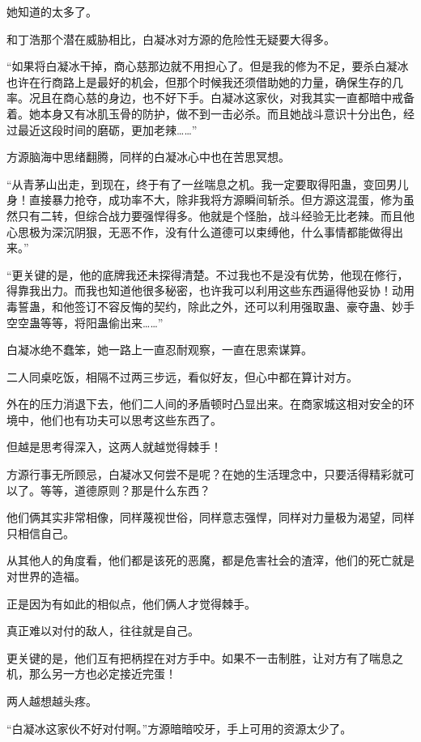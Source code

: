 \begin{this_body}
她知道的太多了。

和丁浩那个潜在威胁相比，白凝冰对方源的危险性无疑要大得多。

“如果将白凝冰干掉，商心慈那边就不用担心了。但是我的修为不足，要杀白凝冰也许在行商路上是最好的机会，但那个时候我还须借助她的力量，确保生存的几率。况且在商心慈的身边，也不好下手。白凝冰这家伙，对我其实一直都暗中戒备着。她本身又有冰肌玉骨的防护，做不到一击必杀。而且她战斗意识十分出色，经过最近这段时间的磨砺，更加老辣……”

方源脑海中思绪翻腾，同样的白凝冰心中也在苦思冥想。

“从青茅山出走，到现在，终于有了一丝喘息之机。我一定要取得阳蛊，变回男儿身！直接暴力抢夺，成功率不大，除非我将方源瞬间斩杀。但方源这混蛋，修为虽然只有二转，但综合战力要强悍得多。他就是个怪胎，战斗经验无比老辣。而且他心思极为深沉阴狠，无恶不作，没有什么道德可以束缚他，什么事情都能做得出来。”

“更关键的是，他的底牌我还未探得清楚。不过我也不是没有优势，他现在修行，得靠我出力。而我也知道他很多秘密，也许我可以利用这些东西逼得他妥协！动用毒誓蛊，和他签订不容反悔的契约，除此之外，还可以利用强取蛊、豪夺蛊、妙手空空蛊等等，将阳蛊偷出来……”

白凝冰绝不蠢笨，她一路上一直忍耐观察，一直在思索谋算。

二人同桌吃饭，相隔不过两三步远，看似好友，但心中都在算计对方。

外在的压力消退下去，他们二人间的矛盾顿时凸显出来。在商家城这相对安全的环境中，他们也有功夫可以思考这些东西了。

但越是思考得深入，这两人就越觉得棘手！

方源行事无所顾忌，白凝冰又何尝不是呢？在她的生活理念中，只要活得精彩就可以了。等等，道德原则？那是什么东西？

他们俩其实非常相像，同样蔑视世俗，同样意志强悍，同样对力量极为渴望，同样只相信自己。

从其他人的角度看，他们都是该死的恶魔，都是危害社会的渣滓，他们的死亡就是对世界的造福。

正是因为有如此的相似点，他们俩人才觉得棘手。

真正难以对付的敌人，往往就是自己。

更关键的是，他们互有把柄捏在对方手中。如果不一击制胜，让对方有了喘息之机，那么另一方也必定接近完蛋！

两人越想越头疼。

“白凝冰这家伙不好对付啊。”方源暗暗咬牙，手上可用的资源太少了。


\end{this_body}
